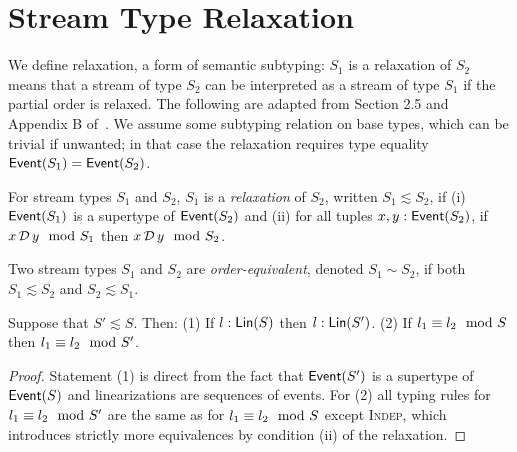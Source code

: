 \section{Stream Type Relaxation}

We define relaxation, a form of semantic subtyping: $S_1$ is a relaxation of $S_2$ means that a stream of type $S_2$ can be interpreted as a stream of type $S_1$ if the partial order is relaxed.
The following are adapted from Section 2.5 and Appendix B of~.
We assume some subtyping relation on base types, which can be trivial if unwanted;
in that case the relaxation requires type equality $\mathsf{Event}(S_1) = \mathsf{Event}(S_2)$.

\begin{definition}
\label{def:stream-relaxation}
For stream types $S_1$ and $S_2$,
$S_1$ is a \emph{relaxation} of $S_2$, written $S_1 \lesssim S_2$, if
(i) $\mathsf{Event}(S_1)$ is a supertype of $\mathsf{Event}(S_2)$
and (ii) for all tuples $x, y: \mathsf{Event}({S_2})$,
if $x \,\mathcal{D}\, y \mod {S_1}$ then $x \,\mathcal{D}\, y \mod {S_2}$.

Two stream types $S_1$ and $S_2$ are \emph{order-equivalent}, denoted $S_1 \sim S_2$, if both $S_1 \lesssim S_2$ and $S_2 \lesssim S_1$.
\end{definition}

\begin{proposition}
\label{prop:stream-relaxation-lin}
\label{45:prop:schema-relaxation-flattening}
Suppose that $S' \lesssim S$. Then:
(1) If $l: \mathsf{Lin}({S})$ then $l: \mathsf{Lin}({S'})$.
(2) If $l_1 \equiv l_2 \mod {S}$ then $l_1 \equiv l_2 \mod {S'}$.
\end{proposition}
\begin{proof}
Statement (1) is direct from the fact that $\mathsf{Event}(S')$ is a supertype of $\mathsf{Event}(S)$
and linearizations are sequences of events.
For (2) all typing rules for $l_1 \equiv l_2 \mod {S'}$ are the same as for $l_1 \equiv l_2 \mod {S}$ except \textsc{Indep}, which introduces strictly more equivalences by condition (ii) of the relaxation.
\end{proof}

